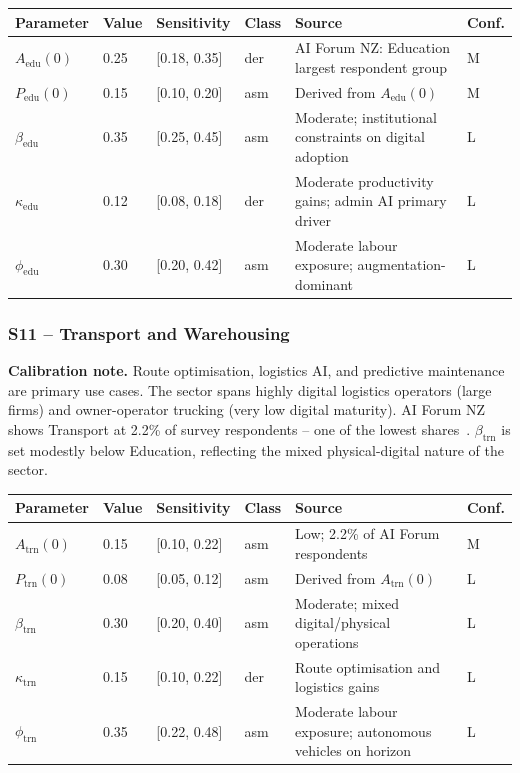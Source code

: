 \documentclass[11pt,a4paper]{article}
\begin{document}
\begin{center}
\begin{tabular}{llllll}
\toprule
Parameter & Value & Sensitivity & Class & Source & Conf.\\
\midrule
$A_{\text{edu}}(0)$ & 0.25 & [0.18, 0.35] & der & AI Forum NZ: Education largest respondent group & M \\
$P_{\text{edu}}(0)$ & 0.15 & [0.10, 0.20] & asm & Derived from $A_{\text{edu}}(0)$ & M \\
$\beta_{\text{edu}}$ & 0.35 & [0.25, 0.45] & asm & Moderate; institutional constraints on digital adoption & L \\
$\kappa_{\text{edu}}$ & 0.12 & [0.08, 0.18] & der & Moderate productivity gains; admin AI primary driver & L \\
$\phi_{\text{edu}}$ & 0.30 & [0.20, 0.42] & asm & Moderate labour exposure; augmentation-dominant & L \\
\bottomrule
\end{tabular}
\end{center}

\subsubsection*{S11 -- Transport and Warehousing}

\textbf{Calibration note.} Route optimisation, logistics AI, and predictive maintenance are primary use cases. The sector spans highly digital logistics operators (large firms) and owner-operator trucking (very low digital maturity). AI Forum NZ shows Transport at 2.2\% of survey respondents -- one of the lowest shares~\cite{aiforum2024}. $\beta_{\text{trn}}$ is set modestly below Education, reflecting the mixed physical-digital nature of the sector.

\begin{center}
\begin{tabular}{llllll}
\toprule
Parameter & Value & Sensitivity & Class & Source & Conf.\\
\midrule
$A_{\text{trn}}(0)$ & 0.15 & [0.10, 0.22] & asm & Low; 2.2\% of AI Forum respondents & M \\
$P_{\text{trn}}(0)$ & 0.08 & [0.05, 0.12] & asm & Derived from $A_{\text{trn}}(0)$ & L \\
$\beta_{\text{trn}}$ & 0.30 & [0.20, 0.40] & asm & Moderate; mixed digital/physical operations & L \\
$\kappa_{\text{trn}}$ & 0.15 & [0.10, 0.22] & der & Route optimisation and logistics gains & L \\
$\phi_{\text{trn}}$ & 0.35 & [0.22, 0.48] & asm & Moderate labour exposure; autonomous vehicles on horizon & L \\
\bottomrule
\end{tabular}
\end{center}
\end{document}
